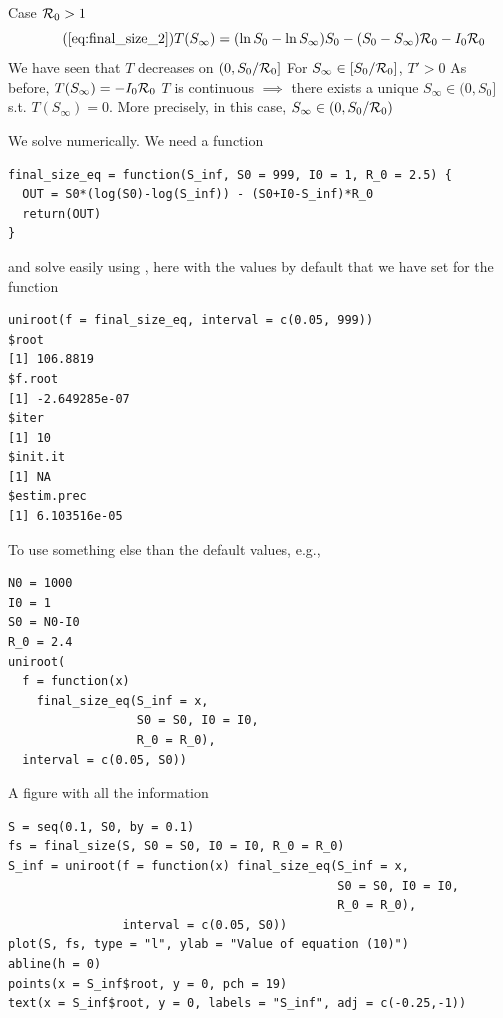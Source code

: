 \documentclass[aspectratio=43]{beamer}
\begin{document}
\begin{frame}{Case $\mathcal{R}_0> 1$}
  \begin{equation}\tag{\ref{eq:final_size_2}}
    T(S_\infty) =(\ln S_0-\ln S_\infty)S_0
    - (S_0-S_\infty)\R_0 -I_0\R_0      
  \end{equation}
  \vfill
  \bbullet We have seen that $T$ decreases on $(0,S_0/\mathcal{R}_0]$
  \vfill
  \bbullet For $S_\infty\in[S_0/\mathcal{R}_0]$, $T'>0$
  \vfill
  \bbullet As before, $T(S_\infty)=-I_0\mathcal{R}_0$
  \vfill
  \bbullet $T$ is continuous
  \vfill
  $\implies$ there exists a unique $S_\infty\in (0,S_0]$ s.t. $T(S_\infty)=0$. More precisely, in this case, $S_\infty\in(0,S_0/\mathcal{R}_0)$
\end{frame}


\begin{frame}[fragile]{}
We solve numerically. We need a function
\begin{lstlisting}  
final_size_eq = function(S_inf, S0 = 999, I0 = 1, R_0 = 2.5) {
  OUT = S0*(log(S0)-log(S_inf)) - (S0+I0-S_inf)*R_0
  return(OUT)
}
\end{lstlisting}
and solve easily using , here with the values by default that we have set for the function
\begin{lstlisting}  
uniroot(f = final_size_eq, interval = c(0.05, 999))
$root
[1] 106.8819
$f.root
[1] -2.649285e-07
$iter
[1] 10
$init.it
[1] NA
$estim.prec
[1] 6.103516e-05
\end{lstlisting}
\end{frame}


\begin{frame}[fragile]{}
To use something else than the default values, e.g.,
\vfill
\begin{lstlisting}  
N0 = 1000
I0 = 1
S0 = N0-I0
R_0 = 2.4
uniroot(
  f = function(x) 
    final_size_eq(S_inf = x, 
                  S0 = S0, I0 = I0, 
                  R_0 = R_0),
  interval = c(0.05, S0))
\end{lstlisting}
\end{frame}


\begin{frame}[fragile]{A figure with all the information}
\begin{lstlisting}
S = seq(0.1, S0, by = 0.1)
fs = final_size(S, S0 = S0, I0 = I0, R_0 = R_0)
S_inf = uniroot(f = function(x) final_size_eq(S_inf = x, 
                                              S0 = S0, I0 = I0, 
                                              R_0 = R_0),
                interval = c(0.05, S0))
plot(S, fs, type = "l", ylab = "Value of equation (10)")
abline(h = 0)
points(x = S_inf$root, y = 0, pch = 19)
text(x = S_inf$root, y = 0, labels = "S_inf", adj = c(-0.25,-1))    
\end{lstlisting}
\end{frame}
\end{document}
